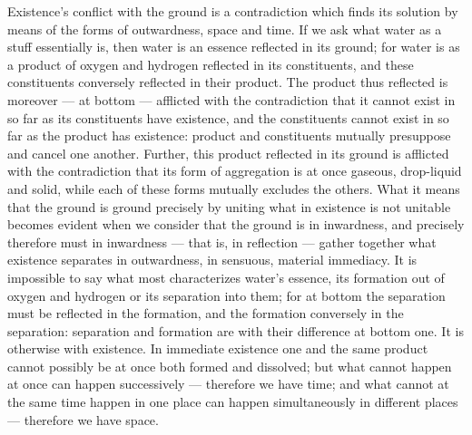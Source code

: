 \documentclass[12pt,a4paper]{book}
\begin{document}
Existence's conflict with the ground is a contradiction which finds its
solution by means of the forms of outwardness, space and time. If we ask what
water as a stuff essentially is, then water is an essence reflected in its
ground; for water is as a product of oxygen and hydrogen reflected in its
constituents, and these constituents conversely reflected in their product. The
product thus reflected is moreover --- at bottom --- afflicted with the
contradiction that it cannot exist in so far as its constituents have
existence, and the constituents cannot exist in so far as the product has
existence: product and constituents mutually presuppose and cancel one another.
Further, this product reflected in its ground is afflicted with the
contradiction that its form of aggregation is at once gaseous, drop-liquid and
solid, while each of these forms mutually excludes the others. What it means
that the ground is ground precisely by uniting what in existence
is not unitable becomes evident when we consider that the ground is in
inwardness, and precisely therefore must in inwardness --- that is, in
reflection --- gather together what existence separates in outwardness, in
sensuous, material immediacy. It is impossible to say what most characterizes
water's essence, its formation out of oxygen and hydrogen or its separation
into them; for at bottom the separation must be reflected in the formation, and
the formation conversely in the separation: separation and formation are with
their difference at bottom one. It is otherwise with existence. In immediate
existence one and the same product cannot possibly be at once both formed and
dissolved; but what cannot happen at once can happen successively --- therefore
we have time; and what cannot at the same time happen in one place can happen
simultaneously in different places --- therefore we have space.
\end{document}
